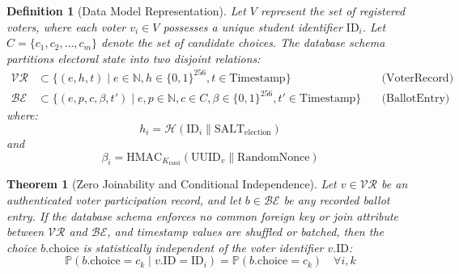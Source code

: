 \documentclass[12pt,a4paper,oneside]{report}
\newtheorem{theorem}{Theorem}[chapter]
\newtheorem{definition}{Definition}[chapter]
\begin{document}
\begin{definition}[Data Model Representation]
Let $V$ represent the set of registered voters, where each voter $v_i \in V$ possesses a unique student identifier $\text{ID}_i$.
Let $C = \{c_1, c_2, \dots, c_m\}$ denote the set of candidate choices.
The database schema partitions electoral state into two disjoint relations:
\begin{align}
    \mathcal{VR} &\subset \{ (e, h, t) \mid e \in \mathbb{N}, h \in \{0,1\}^{256}, t \in \text{Timestamp} \} \quad &\text{(VoterRecord)} \\
    \mathcal{BE} &\subset \{ (e, p, c, \beta, t') \mid e, p \in \mathbb{N}, c \in C, \beta \in \{0,1\}^{256}, t' \in \text{Timestamp} \} \quad &\text{(BallotEntry)}
\end{align}
where:
\begin{equation}
    h_i = \mathcal{H}(\text{ID}_i \parallel \text{SALT}_{\text{election}})
\end{equation}
and
\begin{equation}
    \beta_i = \text{HMAC}_{K_{\text{rand}}}(\text{UUID}_v \parallel \text{RandomNonce})
\end{equation}
\end{definition}

\begin{theorem}[Zero Joinability and Conditional Independence]
Let $v \in \mathcal{VR}$ be an authenticated voter participation record, and let $b \in \mathcal{BE}$ be any recorded ballot entry. If the database schema enforces no common foreign key or join attribute between $\mathcal{VR}$ and $\mathcal{BE}$, and timestamp values are shuffled or batched, then the choice $b.\text{choice}$ is statistically independent of the voter identifier $v.\text{ID}$:
\begin{equation}
    \mathbb{P}(b.\text{choice} = c_k \mid v.\text{ID} = \text{ID}_i) = \mathbb{P}(b.\text{choice} = c_k) \quad \forall i, k
\end{equation}
\end{theorem}
\end{document}
